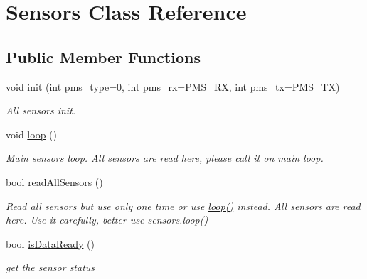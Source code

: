 \hypertarget{classSensors}{}\section{Sensors Class Reference}
\label{classSensors}
\subsection*{Public Member Functions}
\begin{DoxyCompactItemize}
\item 
void \hyperlink{classSensors_a019efdf3e65081e9ace94e1f05338e4b}{init} (int pms\+\_\+type=0, int pms\+\_\+rx=P\+M\+S\+\_\+\+RX, int pms\+\_\+tx=P\+M\+S\+\_\+\+TX)
\begin{DoxyCompactList}\small\item\em All sensors init. \end{DoxyCompactList}\item 
\mbox{\label{classSensors_a255ece4e475221edb8ba7a8983014a76}} 
void \hyperlink{classSensors_a255ece4e475221edb8ba7a8983014a76}{loop} ()
\begin{DoxyCompactList}\small\item\em Main sensors loop. All sensors are read here, please call it on main loop. \end{DoxyCompactList}\item 
\mbox{\label{classSensors_a4f531daf0233f48c3c4e5e91688f90ea}} 
bool \hyperlink{classSensors_a4f531daf0233f48c3c4e5e91688f90ea}{read\+All\+Sensors} ()
\begin{DoxyCompactList}\small\item\em Read all sensors but use only one time or use \hyperlink{classSensors_a255ece4e475221edb8ba7a8983014a76}{loop()} instead. All sensors are read here. Use it carefully, better use sensors.\+loop() \end{DoxyCompactList}\item 
\mbox{\label{classSensors_a63ec661795621129a831a6f837c7f560}} 
bool \hyperlink{classSensors_a63ec661795621129a831a6f837c7f560}{is\+Data\+Ready} ()
\begin{DoxyCompactList}\small\item\em get the sensor status \end{DoxyCompactList}\item 
\mbox{\label{classSensors_ac723c0d9cf5af5daa0fa8d041f41f3d8}} 

\end{DoxyCompactItemize}
